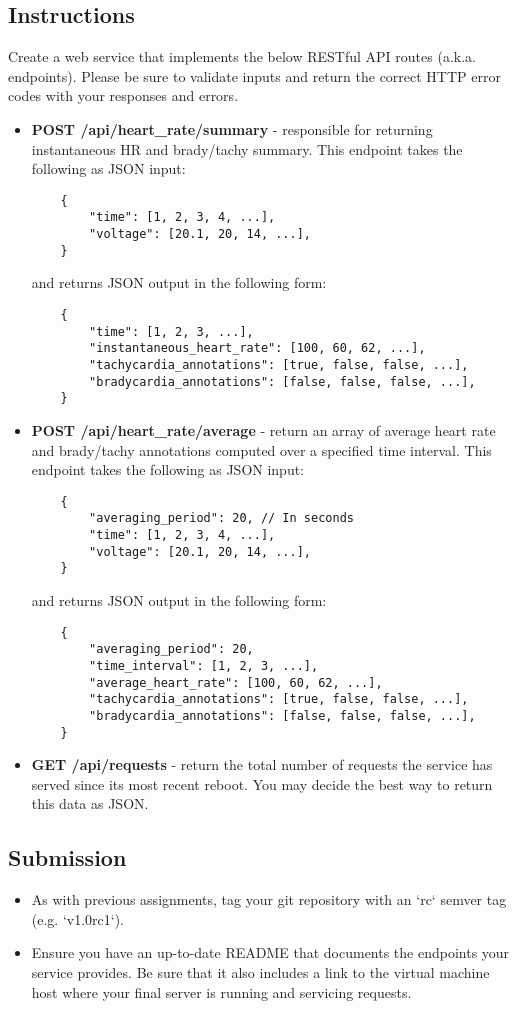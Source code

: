 \subsection*{Instructions}
Create a web service that implements the below RESTful API routes (a.k.a. endpoints). Please be sure to validate inputs and return the correct HTTP error codes with your responses and errors.
\begin{itemize}
	\item {\bf POST /api/heart\_rate/summary} - responsible for returning instantaneous HR and brady/tachy summary.
	This endpoint takes the following as JSON input:	
	\begin{lstlisting}
	{
		"time": [1, 2, 3, 4, ...],
		"voltage": [20.1, 20, 14, ...],
	}
	\end{lstlisting}
	and returns JSON output in the following form:
	\begin{lstlisting}
	{
		"time": [1, 2, 3, ...],
		"instantaneous_heart_rate": [100, 60, 62, ...],  
		"tachycardia_annotations": [true, false, false, ...],
		"bradycardia_annotations": [false, false, false, ...],
	}
	\end{lstlisting}

	\item {\bf POST /api/heart\_rate/average} - return an array of average heart rate and brady/tachy annotations computed over a specified time interval. 
	This endpoint takes the following as JSON input:	
	\begin{lstlisting}
	{
		"averaging_period": 20, // In seconds
		"time": [1, 2, 3, 4, ...],
		"voltage": [20.1, 20, 14, ...],
	}
	\end{lstlisting}
	and returns JSON output in the following form:
	\begin{lstlisting}
	{
		"averaging_period": 20,
		"time_interval": [1, 2, 3, ...],
		"average_heart_rate": [100, 60, 62, ...],  
		"tachycardia_annotations": [true, false, false, ...],
		"bradycardia_annotations": [false, false, false, ...],
	}
	\end{lstlisting}

	\item {\bf GET /api/requests} - return the total number of requests the service has served since its most recent reboot. You may decide the best way to return this data as JSON.
\end{itemize}

\subsection*{Submission}
\begin{itemize}
	\item As with previous assignments, tag your git repository with an `rc` semver tag (e.g. `v1.0rc1`).
	\item Ensure you have an up-to-date README that documents the endpoints your service provides. Be sure that it also includes a link to the virtual machine host where your final server is running and servicing requests.
\end{itemize}


